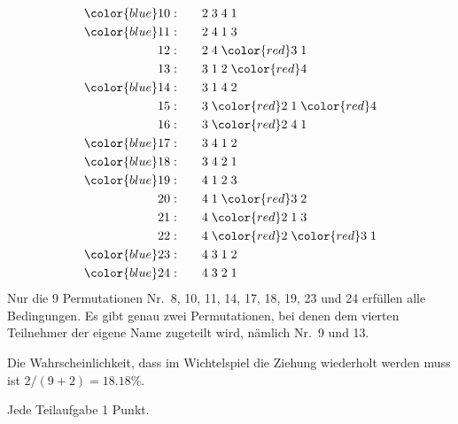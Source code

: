 \begin{loesung}
\begin{teilaufgaben}
\begin{align*}
{\color{blue}
10:}\qquad&            2 \;            3 \;            4 \;            1 \\
{\color{blue}
11:}\qquad&            2 \;            4 \;            1 \;            3 \\
12: \qquad&            2 \;            4 \;{\color{red}3}\;            1 \\
%
13: \qquad&            3 \;            1 \;            2 \;{\color{red}4}\\
{\color{blue}
14:}\qquad&            3 \;            1 \;            4 \;            2 \\
15: \qquad&            3 \;{\color{red}2}\;            1 \;{\color{red}4}\\
16: \qquad&            3 \;{\color{red}2}\;            4 \;            1 \\
{\color{blue}
17:}\qquad&            3 \;            4 \;            1 \;            2 \\
{\color{blue}
18:}\qquad&            3 \;            4 \;            2 \;            1 \\
%
{\color{blue}
19:}\qquad&            4 \;            1 \;            2 \;            3 \\
20: \qquad&            4 \;            1 \;{\color{red}3}\;            2 \\
21: \qquad&            4 \;{\color{red}2}\;            1 \;            3 \\
22: \qquad&            4 \;{\color{red}2}\;{\color{red}3}\;            1 \\
{\color{blue}
23:}\qquad&            4 \;            3 \;            1 \;            2 \\
{\color{blue}
24:}\qquad&            4 \;            3 \;            2 \;            1
\end{align*}
Nur die 9 Permutationen Nr.~{\color{blue}8},
{\color{blue}10},
{\color{blue}11},
{\color{blue}14},
{\color{blue}17},
{\color{blue}18},
{\color{blue}19},
{\color{blue}23} und
{\color{blue}24} erfüllen
alle Bedingungen.
Es gibt genau zwei Permutationen, bei denen dem vierten Teilnehmer der
eigene Name zugeteilt wird, nämlich Nr.~{\color{blue}9} und {\color{blue}13}.
\item
Die Wahrscheinlichkeit, dass im Wichtelspiel die Ziehung wiederholt 
werden muss ist $2/(9 + 2)=18.18\%$.
\qedhere
\end{teilaufgaben}
\end{loesung}

\begin{bewertung}
Jede Teilaufgabe 1 Punkt.
\end{bewertung}

